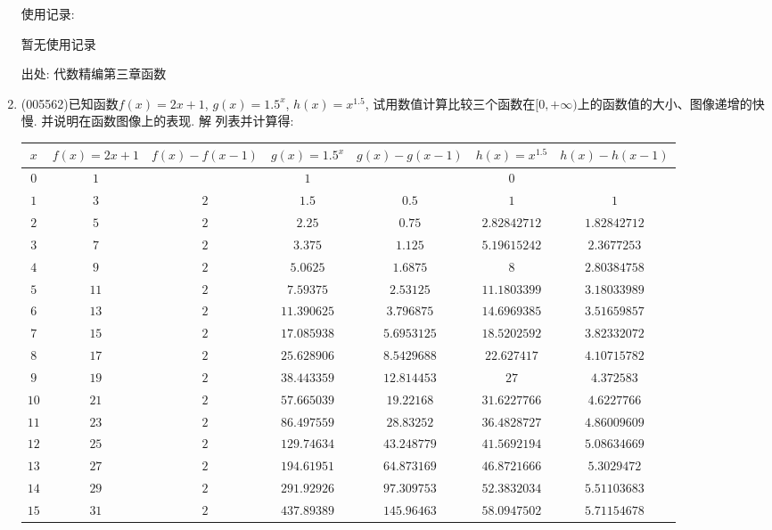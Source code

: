 \documentclass[10pt,a4paper]{article}
\begin{document}
\begin{enumerate}[1.]
使用记录:

暂无使用记录


出处: 代数精编第三章函数
\item { (005562)}已知函数$f(x)=2x+1$, $g(x)=1.5^x$, $h(x)=x^{1.5}$, 试用数值计算比较三个函数在$[0,+\infty)$上的函数值的大小、图像递增的快慢. 并说明在函数图像上的表现.
解  列表并计算得:
\begin{center}
    \begin{longtable}{|c|c|c|c|c|c|c|}
        \hline
        $x$	 & $f(x)=2x+1$ & $f(x)-f(x-1)$ & $g(x)=1.5^x$ & $g(x)-g(x-1)$ & $h(x)=x^{1.5}$ & $h(x)-h(x-1)$ \\ \hline
        \endhead
        $0$ & $1$ & & $1$ & & $0$ &  \\ \hline
        $1$ & $3$ & $2$ & $1.5$ & $0.5$ & $1$ & $1$\\ \hline
        $2$ & $5$ & $2$ & $2.25$ & $0.75$ & $2.82842712$ & $1.82842712$\\ \hline
        $3$ & $7$ & $2$ & $3.375$ & $1.125$ & $5.19615242$ & $2.3677253$\\ \hline
        $4$ & $9$ & $2$ & $5.0625$ & $1.6875$ & $8$ & $2.80384758$\\ \hline
        $5$ & $11$ & $2$ & $7.59375$ & $2.53125$ & $11.1803399$ & $3.18033989$\\ \hline
        $6$ & $13$ & $2$ & $11.390625$ & $3.796875$ & $14.6969385$ & $3.51659857$\\ \hline
        $7$ & $15$ & $2$ & $17.085938$ & $5.6953125$ & $18.5202592$ & $3.82332072$\\ \hline
        $8$ & $17$ & $2$ & $25.628906$ & $8.5429688$ & $22.627417$ & $4.10715782$\\ \hline
        $9$ & $19$ & $2$ & $38.443359$ & $12.814453$ & $27$ & $4.372583$\\ \hline
        $10$ & $21$ & $2$ & $57.665039$ & $19.22168$ & $31.6227766$ & $4.6227766$\\ \hline
        $11$ & $23$ & $2$ & $86.497559$ & $28.83252$ & $36.4828727$ & $4.86009609$\\ \hline
        $12$ & $25$ & $2$ & $129.74634$ & $43.248779$ & $41.5692194$ & $5.08634669$\\ \hline
        $13$ & $27$ & $2$ & $194.61951$ & $64.873169$ & $46.8721666$ & $5.3029472$\\ \hline
        $14$ & $29$ & $2$ & $291.92926$ & $97.309753$ & $52.3832034$ & $5.51103683$\\ \hline
        $15$ & $31$ & $2$ & $437.89389$ & $145.96463$ & $58.0947502$ & $5.71154678$\\ \hline

\end{longtable}
\end{center}
\end{enumerate}
\end{document}
